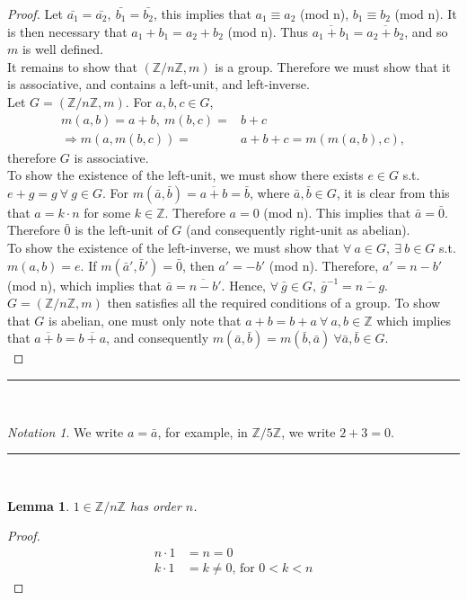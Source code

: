 \documentclass{article}
\newtheorem{lemma}[theorem]{Lemma}
\theoremstyle{definition}
\theoremstyle{remark}
\newtheorem*{notation}{Notation}
\begin{document}
\begin{proof}
Let $\bar{a_1}=\bar{a_2},~\bar{b_1}=\bar{b_2}$, this implies that $a_1\equiv a_2 $ (mod n), $b_1\equiv b_2$ (mod n). It is then necessary that $a_1+b_1=a_2+b_2$ (mod n). Thus $\overline{a_1+b_1}=\overline{a_2+b_2}$, and so $m$ is well defined.\\
\indent It remains to show that $(\mathbb{Z}/n\mathbb{Z},m)$ is a group. Therefore we must show that it is associative, and contains a left-unit, and left-inverse.\\
\indent Let $G=(\mathbb{Z}/n\mathbb{Z},m)$. For $a,b,c\in G$,
\begin{align*}
m(a,b)=a+b, ~m(b,c)=&b+c\\
\Rightarrow m(a,m(b,c))=&a+b+c=m(m(a,b),c),
\end{align*}
 therefore $G$ is associative. \\ \indent To show the existence of the left-unit, we must show there exists $e\in G$ s.t. $e+g=g~\forall~g\in G$. For $m(\bar{a},\bar{b})=\overline{a+b}=\bar{b}$, where $\bar{a},\bar{b}\in G$, it is clear from this that $a=k\cdot n$ for some $k\in \mathbb{Z}$. Therefore $a=0$ (mod n). This implies that $\bar{a}=\bar{0}$. Therefore $\bar{0}$ is the left-unit of $G$ (and consequently right-unit as abelian).\\
 \indent To show the existence of the left-inverse, we must show that $\forall~a\in G, ~\exists ~ b\in G$ s.t. $m(a,b)=e$. If $m(\bar{a}',\bar{b}')=\bar{0}$, then $a'=-b'$ (mod n). Therefore, $a'=n-b'$ (mod n), which implies that $\bar{a}=\overline{n-b}'$. Hence, $\forall~\bar{g}\in G, ~\bar{g}^{-1}=\overline{n-g}$.\\
 \indent $G=(\mathbb{Z}/n\mathbb{Z},m) $ then satisfies all the required conditions of a  group. To show that $G$ is abelian, one must only note that $a+b=b+a~\forall ~ a,b\in \mathbb{Z}$ which implies that $\overline{a+b}=\overline{b+a}$, and consequently $m(\bar{a},\bar{b})=m(\bar{b},\bar{a})~\forall \bar{a},\bar{b}\in G$.\\
\end{proof}

\hrule
\vspace{2mm}~\\
\begin{notation}
We write $a=\bar{a}$, for example, in $\mathbb{Z}/5\mathbb{Z}$, we write $2+3=0$.\\
\end{notation}

\hrule
\vspace{2mm}~\\
\begin{lemma}
$1\in\mathbb{Z}/n\mathbb{Z}$ has order $n$.
\end{lemma}
\begin{proof}
\begin{align*}
n\cdot 1 &= n = 0\\
k\cdot 1&=k\neq 0 \text{, for } 0<k<n
\end{align*}
\end{proof}
\end{document}
